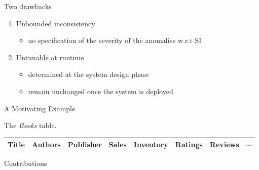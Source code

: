 \begin{frame}{Two drawbacks}
  \begin{enumerate}
    \setlength{\itemsep}{8pt}
    \item Unbounded inconsistency
      \begin{itemize}
	\item no specification of the severity of the anomalies w.r.t SI
      \end{itemize}
    \item Untunable at runtime
      \begin{itemize}
	\setlength{\itemsep}{5pt}
	\item determined at the system design phase
	\item remain unchanged once the system is deployed
      \end{itemize}
  \end{enumerate}
\end{frame}

\begin{frame}{A Motivating Example}
  \centerline{The \emph{Books} table.}
  \begin{table}
    \centering
    \begin{tabular}{|c|c|c|c|c|c|c|c|}
      \hline
      Title & Authors & Publisher & Sales & Inventory & Ratings & Reviews & $\cdots$ \\
      \hline
    \end{tabular}
  \end{table}

  \begin{description}
    \item[Customer:]
    \item[Bookstore Clerk:]
    \item[Sales Analyst:]
  \end{description}
\end{frame}

\begin{frame}{Contributions}
\end{frame}

\begin{frame}{}
\end{frame}
